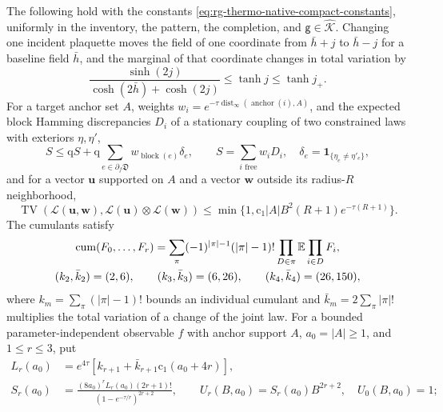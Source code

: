 The following hold with the constants
\cref{eq:rg-thermo-native-compact-constants}, uniformly in the inventory, the
pattern, the completion, and $\mathsf g\in\widehat{\mathcal K}$.
Changing one incident plaquette moves the field of one coordinate from
$\bar h+j$ to $\bar h-j$ for a baseline field $\bar h$, and the marginal of
that coordinate changes in total variation by
\begin{equation}
 \frac{\sinh(2j)}{\cosh(2\bar h)+\cosh(2j)}\le\tanh j\le\tanh j_+.
 \label{eq:rg-thermo-native-fiber-tilt}
\end{equation}
For a target anchor set $A$, weights
$w_i=e^{-\tau\operatorname{dist}_\infty(\operatorname{anchor}(i),A)}$, and the
expected block Hamming discrepancies $D_i$ of a stationary coupling of two
constrained laws with exteriors $\eta,\eta'$,
\begin{equation}
 S\le\mathrm qS+\mathrm q\sum_{e\in\partial_f\mathfrak D}w_{\operatorname{block}(e)}\delta_e,
 \qquad S=\sum_{i\text{ free}}w_iD_i,
 \quad \delta_e=\mathbf1_{\{\eta_e\ne\eta'_e\}},
 \label{eq:rg-thermo-native-weighted-comparison}
\end{equation}
and for a vector $\mathbf u$ supported on $A$ and a vector $\mathbf w$ outside its radius-$R$
neighborhood,
\begin{equation}
 \operatorname{TV}(\mathcal L(\mathbf u,\mathbf w),\mathcal L(\mathbf u)\otimes\mathcal L(\mathbf w))
 \le\min\{1,\mathrm c_1|A|B^2(R+1)e^{-\tau(R+1)}\}.
 \label{eq:rg-thermo-native-group-decoupling}
\end{equation}
The cumulants satisfy
\begin{equation}
 \begin{gathered}
 \operatorname{cum}(F_0,\ldots,F_r)
 =\sum_{\pi}(-1)^{|\pi|-1}(|\pi|-1)!
                  \prod_{D\in\pi}\mathbb E\prod_{i\in D}F_i,\\
 (k_2,\bar k_2)=(2,6),\qquad (k_3,\bar k_3)=(6,26),\qquad
 (k_4,\bar k_4)=(26,150),
 \end{gathered}
 \label{eq:rg-thermo-native-cumulant-partitions}
\end{equation}
where $k_m=\sum_\pi(|\pi|-1)!$ bounds an individual cumulant and
$\bar k_m=2\sum_\pi|\pi|!$ multiplies the total variation of a change of the joint
law. For a bounded parameter-independent observable $f$ with anchor support
$A$, $a_0=|A|\ge1$, and $1\le r\le3$, put
\begin{equation}
 \begin{split}
 L_r(a_0)&=e^{4\tau}[k_{r+1}+\bar k_{r+1}\mathrm c_1(a_0+4r)],\\
 S_r(a_0)&=\frac{(8a_0)^rL_r(a_0)(2r+1)!}
                    {(1-e^{-\tau/r})^{2r+2}},\qquad
 U_r(B,a_0)=S_r(a_0)B^{2r+2},\quad U_0(B,a_0)=1;
 \end{split}
 \label{eq:rg-thermo-native-response-constants}
\end{equation}
